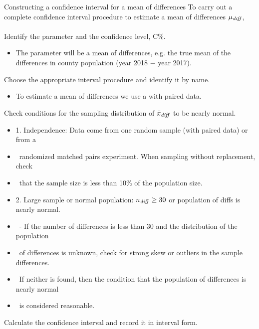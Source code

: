 \begin{onebox}{Constructing a confidence interval for a mean of differences}
To carry out a complete confidence interval procedure to estimate a mean of differences $\mu_{\text{\emph{diff}}}$,
\\
\\
 Identify the parameter and the confidence level, C\%.\vspace{-1mm}
\begin{itemize} 
\item[] The parameter will be a mean of differences, e.g. the true mean of the differences in county population (year 2018 $-$ year 2017).  
\end{itemize}
 Choose the appropriate interval procedure and identify it by name. \vspace{-1mm}
\begin{itemize}
\item[] To estimate a mean of differences we use a  with paired data.
\end{itemize}
 Check conditions for the sampling distribution of $\bar{x}_{\text{\emph{diff}}}$ to be nearly normal.\vspace{-1mm}
\begin{itemize}
\setlength{\itemsep}{0mm}
\item[] 1. Independence:  Data come from one random sample (with paired data) or from a 
\item[] \ \quad randomized matched pairs experiment.  When sampling without replacement, check 
\item[] \ \quad that the sample size is less than 10\% of the population size.
\item[] 2. Large sample or normal population:  $n_{\text{\emph{diff}}}\ge 30$ or population of diffs is nearly normal.
 \item[] \quad \  - If the number of differences is less than 30 and the distribution of the population 
 \item[] \quad \ of differences is unknown, check for strong skew or outliers in the sample differences.
\item[] \quad \ If neither is found, then the condition that the population of differences is nearly normal 
\item[] \quad \ is considered reasonable.  
\end{itemize}
  Calculate the confidence interval and record it in interval form.

\end{onebox}
